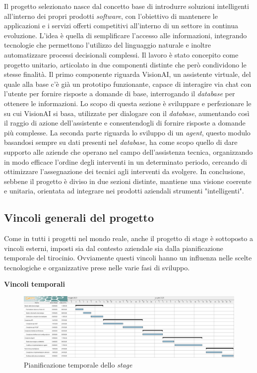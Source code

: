 Il progetto selezionato nasce dal concetto base di introdurre soluzioni intelligenti all'interno dei propri prodotti \textit{software}, con l'obiettivo di mantenere le applicazioni e i servizi offerti competitivi all'interno di un settore in continua evoluzione. 
L'idea è quella di semplificare l'accesso alle informazioni, integrando tecnologie che permettono l'utilizzo del linguaggio naturale e inoltre automatizzare processi decisionali complessi.
Il lavoro è stato concepito come progetto unitario, articolato in due componenti distinte che però condividono le stesse finalità.
Il primo componente riguarda  VisionAI, un assistente virtuale, del quale alla base c'è già un prototipo funzionante, capace di interagire via chat con l'utente per fornire risposte a domande di base, interrogando il \textit{database} per ottenere le informazioni.
Lo scopo di questa sezione è sviluppare e perfezionare le  su cui VisionAI si basa, utilizzate per dialogare con il \textit{database}, aumentando così il raggio di azione dell'assistente e consentendogli di fornire risposte a domande più complesse.
La seconda parte riguarda lo sviluppo di un \textit{agent}, questo modulo basandosi sempre su dati presenti nel \textit{database}, ha come scopo quello di dare supporto alle aziende che operano nel campo dell'assistenza tecnica, organizzando in modo efficace l'ordine degli interventi in un determinato periodo, cercando di ottimizzare l'assegnazione dei tecnici agli interventi da svolgere.
In conclusione, sebbene il progetto è diviso in due sezioni distinte, mantiene una visione coerente e unitaria, orientata ad integrare nei prodotti aziendali strumenti "intelligenti".

\subsection{Vincoli generali del progetto}
Come in tutti i progetti nel mondo reale, anche il progetto di stage è sottoposto a vincoli esterni, imposti sia dal contesto aziendale sia dalla pianificazione temporale del tirocinio. Ovviamente questi vincoli hanno un influenza nelle scelte tecnologiche e organizzative prese nelle varie fasi di sviluppo.

\textbf{Vincoli temporali}
\begin{figure}[H]
    \centering
    \includegraphics[width=\textwidth]{thesis/files/img/gaant.png}
    \caption{Pianificazione temporale dello \textit{stage}}
    \label{fig:pianificazione-stage}
\end{figure}

